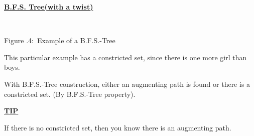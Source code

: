 \documentclass[twoside]{article}
\newcounter{lecnum}
\newcommand{\fig}[3]{
      \vspace{#2}
      \begin{center}
      Figure \thelecnum.#1:~#3
      \end{center}
  }
\begin{document}
\newpage
\underline{\textbf{B.F.S. Tree(with a twist)}}\\

\begin{minipage}{0.4\textwidth}
\\
\fig{4}{0in}{Example of a B.F.S.-Tree}
\end{minipage}
\begin{minipage}{0.6\textwidth}
This particular example has a constricted set, since there is one more girl than boys.

\vspace{13mm}
With B.F.S.-Tree construction, either an augmenting path is found or there is a constricted set. (By B.F.S.-Tree property).
\vspace{13mm}

\underline{\textbf{TIP}}

If there is no constricted set, then you know there is an augmenting path.\\
\end{minipage}
\end{document}
